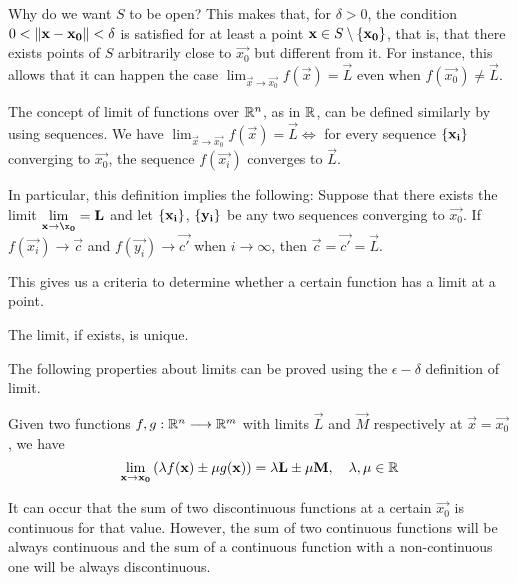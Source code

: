\begin{note}
    Why do we want $S$ to be open? This makes that, for $\delta > 0$, the condition $0 < \left\Vert \mathbf{x} - \mathbf{x_0} \right\Vert < \delta$
    is satisfied for at least a point $\mathbf{x}\in S\setminus\{ \mathbf{x_0} \}$, that is, that there exists points of $S$
    arbitrarily close to $\vec{x_0}$ but different from it. For instance, this allows that it can happen the case 
    $\lim_{\vec{x}\to\vec{x_0}}f(\vec{x}) = \vec{L}$ even when $f(\vec{x_0})\neq \vec{L}$.
\end{note}

\begin{note}
The concept of limit of functions over $\Rtn$, as in $\R$, can be defined similarly by using sequences. We have 
$\lim_{\vec{x}\to\vec{x_0}} f(\vec{x}) = \vec{L}\iff$ for every sequence $\{ \mathbf{x_i} \}$ converging to $\vec{x_0}$, the
    sequence $f(\vec{x_i})$ converges to $\vec{L}$.

    In particular, this definition implies the following: Suppose that there exists the limit $\lim_{\vec{x}\to\vec{\x_0}}
    = \vec{L}$ and let $\{ \mathbf{x_i} \}$, $\{ \mathbf{y_i} \}$ be any two sequences converging to $\vec{x_0}$. If 
    $f(\vec{x_i})\longrightarrow\vec{c}$ and $f(\vec{y_i})\longrightarrow\vec{c'}$ when $i\longrightarrow\infty$, then
    $\vec{c} = \vec{c'} = \vec{L}$.

    This gives us a criteria to determine whether a certain function has a limit at a point. 
\end{note}

\begin{prop}
    The limit, if exists, is unique.
\end{prop}

The following properties about limits can be proved using the $\epsilon-\delta$ definition of limit.

\begin{prop}
    Given two functions $\appl{f, g}{\Rtn}{\R^m}$ with limits $\vec{L}$ and $\vec{M}$ respectively at 
    $\vec{x} = \vec{x_0}$, we have
    \begin{equation}
        \lim_{\vec{x}\to\vec{x_0}} \left(\lambda f(\vec{x})\pm \mu g(\vec{x})\right) = \lambda\vec{L}\pm \mu\vec{M},\quad
            \lambda, \mu\in\R
    \end{equation}
\end{prop}

\begin{remark}
    It can occur that the sum of two discontinuous functions at a certain $\vec{x_0}$ is continuous for that value.
    However, the sum of two continuous functions will be always continuous and the sum of a continuous function with a 
    non-continuous one will be always discontinuous.
\end{remark}

